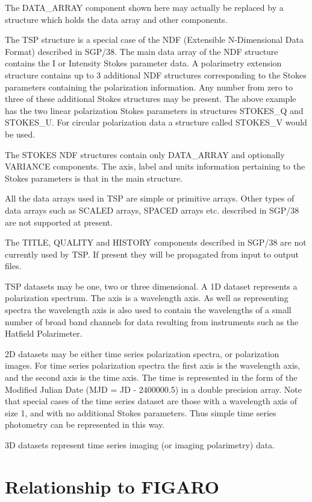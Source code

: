 \documentclass[11pt,twoside,nolof,noabs]{starlink}
\begin{document}
The DATA\_ARRAY component shown here may actually be replaced by a structure
which holds the data array and other components.

The TSP structure is a special case of the NDF (Extensible N-Dimensional
Data Format) described in SGP/38. The main data array of the NDF structure
contains the I or Intensity Stokes parameter data. A polarimetry extension
structure contains up to 3 additional NDF structures corresponding to the
Stokes parameters containing the polarization information. Any number from
zero to three of these additional Stokes structures may be present. The
above example has the two linear polarization Stokes parameters in structures
STOKES\_Q and STOKES\_U. For circular polarization data
a structure called STOKES\_V would be used.

The STOKES NDF structures contain only DATA\_ARRAY and optionally VARIANCE
components. The axis, label and units information pertaining to the Stokes
parameters is that in the main structure.

All the data arrays used in TSP are simple or primitive arrays. Other types
of data arrays such as SCALED arrays, SPACED arrays etc. described in SGP/38
are not supported at present.

The TITLE, QUALITY and HISTORY components described in SGP/38 are not
currently used by TSP. If present they will be propagated from input to
output files.

TSP datasets may be one, two or three dimensional. A 1D dataset represents
a polarization spectrum. The axis is a wavelength axis. As well as representing
spectra the wavelength axis is also used to contain the wavelengths of a
small number of broad band channels for data resulting from instruments
such as the Hatfield Polarimeter.

2D datasets may be either time series polarization spectra, or polarization images. For time series polarization spectra the first axis
is the wavelength axis, and the second axis is the time axis. The time is
represented in the form of the Modified Julian Date (MJD = JD - 2400000.5)
in a double precision array. Note that special cases of the time series
dataset are those with a wavelength axis of size 1, and with no additional
Stokes parameters. Thus simple time series photometry can be represented
in this way.

3D datasets represent time series imaging (or imaging polarimetry) data.

\section{Relationship to FIGARO}
\end{document}
